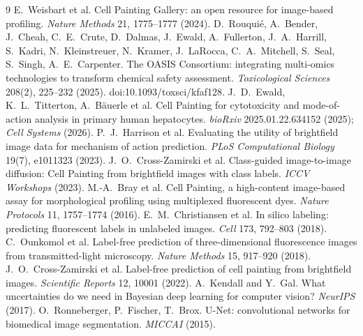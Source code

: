 \documentclass[11pt,a4paper]{article}
\begin{document}
\begin{thebibliography}{9}
 E.~Weisbart et al. Cell Painting Gallery: an open resource for image-based profiling. \emph{Nature Methods} 21, 1775--1777 (2024).
 D.~Rouqui\'e, A.~Bender, J.~Cheah, C.~E.~Crute, D.~Dalmas, J.~Ewald, A.~Fullerton, J.~A.~Harrill, S.~Kadri, N.~Kleinstreuer, N.~Kramer, J.~LaRocca, C.~A.~Mitchell, S.~Seal, S.~Singh, A.~E.~Carpenter. The OASIS Consortium: integrating multi-omics technologies to transform chemical safety assessment. \emph{Toxicological Sciences} 208(2), 225--232 (2025). doi:10.1093/toxsci/kfaf128.
 J.~D.~Ewald, K.~L.~Titterton, A.~B\"auerle et al. Cell Painting for cytotoxicity and mode-of-action analysis in primary human hepatocytes. \emph{bioRxiv} 2025.01.22.634152 (2025); \emph{Cell Systems} (2026).
 P.~J.~Harrison et al. Evaluating the utility of brightfield image data for mechanism of action prediction. \emph{PLoS Computational Biology} 19(7), e1011323 (2023).
 J.~O.~Cross-Zamirski et al. Class-guided image-to-image diffusion: Cell Painting from brightfield images with class labels. \emph{ICCV Workshops} (2023).
 M.-A.~Bray et al. Cell Painting, a high-content image-based assay for morphological profiling using multiplexed fluorescent dyes. \emph{Nature Protocols} 11, 1757--1774 (2016).
 E.~M.~Christiansen et al. In silico labeling: predicting fluorescent labels in unlabeled images. \emph{Cell} 173, 792--803 (2018).
 C.~Ounkomol et al. Label-free prediction of three-dimensional fluorescence images from transmitted-light microscopy. \emph{Nature Methods} 15, 917--920 (2018).
 J.~O.~Cross-Zamirski et al. Label-free prediction of cell painting from brightfield images. \emph{Scientific Reports} 12, 10001 (2022).
 A.~Kendall and Y.~Gal. What uncertainties do we need in Bayesian deep learning for computer vision? \emph{NeurIPS} (2017).
 O.~Ronneberger, P.~Fischer, T.~Brox. U-Net: convolutional networks for biomedical image segmentation. \emph{MICCAI} (2015).
\end{thebibliography}
\end{document}
